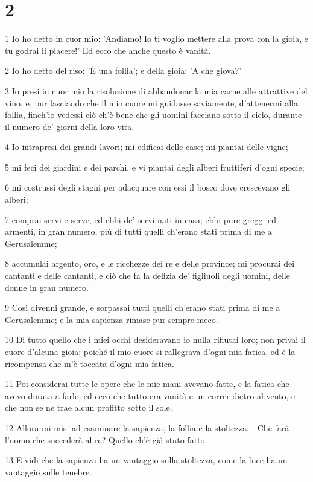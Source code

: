 \chapter{2}

\par 1 Io ho detto in cuor mio: 'Andiamo! Io ti voglio mettere alla prova con la gioia, e tu godrai il piacere!' Ed ecco che anche questo è vanità.
\par 2 Io ho detto del riso: 'È una follia'; e della gioia: 'A che giova?'
\par 3 Io presi in cuor mio la risoluzione di abbandonar la mia carne alle attrattive del vino, e, pur lasciando che il mio cuore mi guidasse saviamente, d'attenermi alla follia, finch'io vedessi ciò ch'è bene che gli uomini facciano sotto il cielo, durante il numero de' giorni della loro vita.
\par 4 Io intrapresi dei grandi lavori; mi edificai delle case; mi piantai delle vigne;
\par 5 mi feci dei giardini e dei parchi, e vi piantai degli alberi fruttiferi d'ogni specie;
\par 6 mi costrussi degli stagni per adacquare con essi il bosco dove crescevano gli alberi;
\par 7 comprai servi e serve, ed ebbi de' servi nati in casa; ebbi pure greggi ed armenti, in gran numero, più di tutti quelli ch'erano stati prima di me a Gerusalemme;
\par 8 accumulai argento, oro, e le ricchezze dei re e delle province; mi procurai dei cantanti e delle cantanti, e ciò che fa la delizia de' figliuoli degli uomini, delle donne in gran numero.
\par 9 Così divenni grande, e sorpassai tutti quelli ch'erano stati prima di me a Gerusalemme; e la mia sapienza rimase pur sempre meco.
\par 10 Di tutto quello che i miei occhi desideravano io nulla rifiutai loro; non privai il cuore d'alcuna gioia; poiché il mio cuore si rallegrava d'ogni mia fatica, ed è la ricompensa che m'è toccata d'ogni mia fatica.
\par 11 Poi considerai tutte le opere che le mie mani avevano fatte, e la fatica che avevo durata a farle, ed ecco che tutto era vanità e un correr dietro al vento, e che non se ne trae alcun profitto sotto il sole.
\par 12 Allora mi misi ad esaminare la sapienza, la follia e la stoltezza. - Che farà l'uomo che succederà al re? Quello ch'è già stato fatto. -
\par 13 E vidi che la sapienza ha un vantaggio sulla stoltezza, come la luce ha un vantaggio sulle tenebre.
